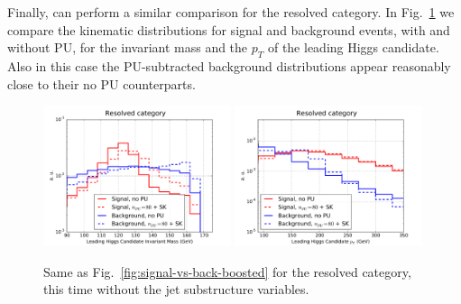 Finally, can perform a similar comparison for
the resolved category.
%
In Fig.~\ref{fig:signal-vs-back-resolved} we compare
the kinematic distributions for signal and background events,
     with and without PU, for the invariant mass and the $p_T$ of the leading
     Higgs candidate.
     Also in this
     case the PU-subtracted background distributions appear reasonably close
     to their no PU counterparts.

\begin{figure}[t]
  \begin{center}
   \includegraphics[width=0.49\textwidth]{plots/m_h0_res_comp_back.pdf}
  \includegraphics[width=0.49\textwidth]{plots/pt_h0_res_comp_back.pdf}
     \caption{\small
       Same as Fig.~\ref{fig:signal-vs-back-boosted} for the resolved category,
       this time without the jet substructure variables.
}
\label{fig:signal-vs-back-resolved}
\end{center}
\end{figure}




